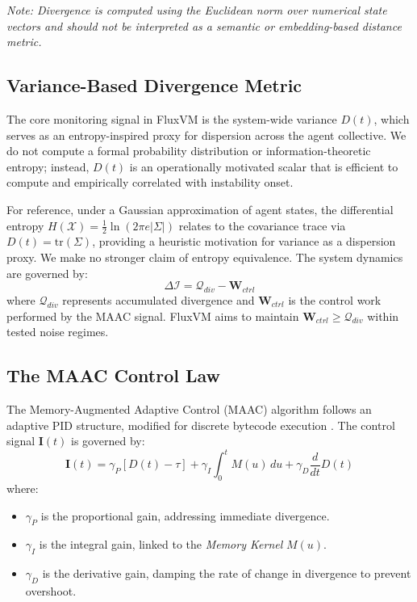 \documentclass{article}
\begin{document}
\textit{Note: Divergence is computed using the Euclidean norm over numerical state
vectors and should not be interpreted as a semantic or embedding-based distance
metric.}

\subsection{Variance-Based Divergence Metric}
The core monitoring signal in FluxVM is the system-wide variance $D(t)$, which serves as an entropy-inspired proxy for dispersion across the agent collective. We do not compute a formal probability distribution or information-theoretic entropy; instead, $D(t)$ is an operationally motivated scalar that is efficient to compute and empirically correlated with instability onset.

For reference, under a Gaussian approximation of agent states, the differential entropy $H(\mathcal{X}) = \frac{1}{2}\ln(2\pi e |\Sigma|)$ relates to the covariance trace via $D(t) = \mathrm{tr}(\Sigma)$, providing a heuristic motivation for variance as a dispersion proxy. We make no stronger claim of entropy equivalence. The system dynamics are governed by:
\begin{equation}
    \Delta \mathcal{I} = \mathcal{Q}_{div} - \mathbf{W}_{ctrl}
\end{equation}
where $\mathcal{Q}_{div}$ represents accumulated divergence and $\mathbf{W}_{ctrl}$ is the control work performed by the MAAC signal. FluxVM aims to maintain $\mathbf{W}_{ctrl} \ge \mathcal{Q}_{div}$ within tested noise regimes.

\subsection{The MAAC Control Law}
The Memory-Augmented Adaptive Control (MAAC) algorithm follows an adaptive PID structure, modified for discrete bytecode execution \cite{astrom2008adaptive}.
The control signal $\mathbf{I}(t)$ is governed by:
\begin{equation}
    \mathbf{I}(t) = \gamma_P [D(t) - \tau] + \gamma_I \int_{0}^{t} M(u)\, du + \gamma_D \frac{d}{dt} D(t)
    \label{eq:maac}
\end{equation}
where:
\begin{itemize}
    \item $\gamma_P$ is the proportional gain, addressing immediate divergence.
    \item $\gamma_I$ is the integral gain, linked to the \textit{Memory Kernel} $M(u)$.
    \item $\gamma_D$ is the derivative gain, damping the rate of change in divergence to prevent overshoot.
\end{itemize}
\end{document}
